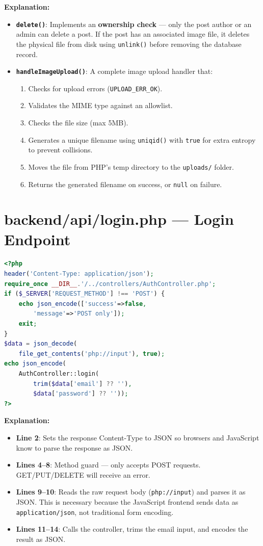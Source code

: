 \documentclass[12pt,a4paper]{report}
\begin{document}
\textbf{Explanation:}
\begin{itemize}
    \item \textbf{\texttt{delete()}}: Implements an \textbf{ownership check} --- only the post author or an admin can delete a post. If the post has an associated image file, it deletes the physical file from disk using \texttt{unlink()} before removing the database record.
    \item \textbf{\texttt{handleImageUpload()}}: A complete image upload handler that:
    \begin{enumerate}
        \item Checks for upload errors (\texttt{UPLOAD\_ERR\_OK}).
        \item Validates the MIME type against an allowlist.
        \item Checks the file size (max 5MB).
        \item Generates a unique filename using \texttt{uniqid()} with \texttt{true} for extra entropy to prevent collisions.
        \item Moves the file from PHP's temp directory to the \texttt{uploads/} folder.
        \item Returns the generated filename on success, or \texttt{null} on failure.
    \end{enumerate}
\end{itemize}

\section{backend/api/login.php --- Login Endpoint}

\begin{lstlisting}[language=PHP]
<?php
header('Content-Type: application/json');
require_once __DIR__.'/../controllers/AuthController.php';
if ($_SERVER['REQUEST_METHOD'] !== 'POST') {
    echo json_encode(['success'=>false,
        'message'=>'POST only']);
    exit;
}
$data = json_decode(
    file_get_contents('php://input'), true);
echo json_encode(
    AuthController::login(
        trim($data['email'] ?? ''),
        $data['password'] ?? ''));
?>
\end{lstlisting}

\textbf{Explanation:}
\begin{itemize}
    \item \textbf{Line 2}: Sets the response Content-Type to JSON so browsers and JavaScript know to parse the response as JSON.
    \item \textbf{Lines 4--8}: Method guard --- only accepts POST requests. GET/PUT/DELETE will receive an error.
    \item \textbf{Lines 9--10}: Reads the raw request body (\texttt{php://input}) and parses it as JSON. This is necessary because the JavaScript frontend sends data as \texttt{application/json}, not traditional form encoding.
    \item \textbf{Lines 11--14}: Calls the controller, trims the email input, and encodes the result as JSON.
\end{itemize}
\end{document}
